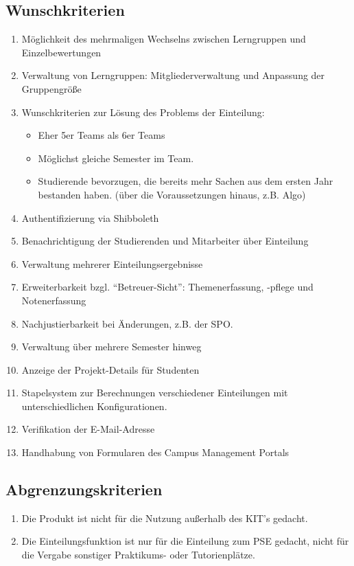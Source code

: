 \documentclass[parskip=full]{scrartcl}
\newcommand{\swtLabel}[1]{\textbf{\textbackslash #1\arabic*0\textbackslash}}
\begin{document}
\subsection{Wunschkriterien}
\begin{enumerate}[label=\swtLabel{W}]
    \item Möglichkeit des mehrmaligen Wechselns zwischen Lerngruppen und \\
    Einzelbewertungen
    \item Verwaltung von Lerngruppen: Mitgliederverwaltung und Anpassung der
    Gruppengröße
    \item Wunschkriterien zur Lösung des Problems der Einteilung:
    \begin{itemize}
        \item Eher 5er Teams als 6er Teams
        \item Möglichst gleiche Semester im Team.
        \item Studierende bevorzugen, die bereits mehr Sachen aus dem ersten Jahr
        bestanden haben. (über die Voraussetzungen hinaus, z.B. Algo)
    \end{itemize}    
    \item Authentifizierung via Shibboleth
    \item Benachrichtigung der Studierenden und Mitarbeiter über Einteilung
    \item Verwaltung mehrerer Einteilungsergebnisse
    \item Erweiterbarkeit bzgl. “Betreuer-Sicht”: Themenerfassung, -pflege und Notenerfassung
    \item Nachjustierbarkeit bei Änderungen, z.B. der SPO.
    \item Verwaltung über mehrere Semester hinweg
    \item Anzeige der Projekt-Details für Studenten
    \item Stapelsystem zur Berechnungen verschiedener Einteilungen mit unterschiedlichen Konfigurationen.
    \item Verifikation der E-Mail-Adresse
    \item Handhabung von Formularen des Campus Management Portals
    
    
    
\end{enumerate}

\subsection{Abgrenzungskriterien}
\begin{enumerate}[label=\swtLabel{A}]
 
  \item Die Produkt ist nicht für die Nutzung außerhalb des KIT's gedacht.

\item Die Einteilungsfunktion ist nur für die Einteilung zum PSE gedacht, nicht
für die Vergabe sonstiger Praktikums- oder Tutorienplätze.
  
\end{enumerate}
\end{document}
